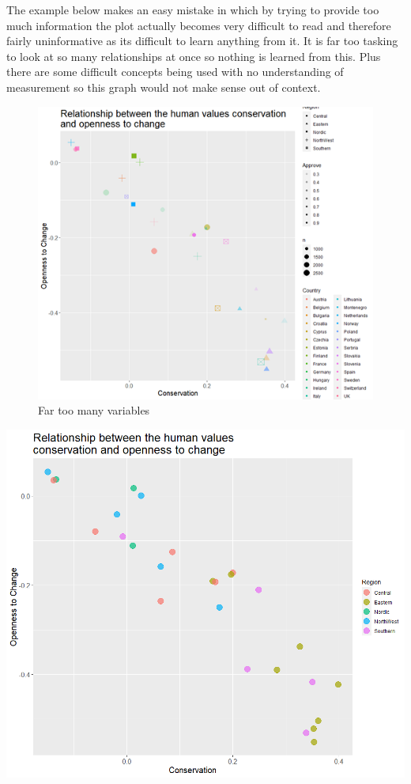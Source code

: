 \documentclass[
]{book}
\begin{document}
The example below makes an easy mistake in which by trying to provide too much information the plot actually becomes very difficult to read and therefore fairly uninformative as its difficult to learn anything from it. It is far too tasking to look at so many relationships at once so nothing is learned from this. Plus there are some difficult concepts being used with no understanding of measurement so this graph would not make sense out of context.

\begin{figure}
\centering
\includegraphics{img/Too many variables.png}
\caption{Far too many variables}
\end{figure}

\includegraphics[width=13.28in]{img/not too much man}
\end{document}
